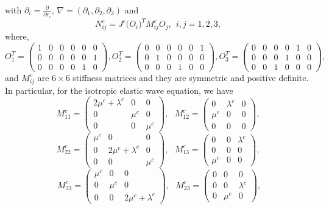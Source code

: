 with $\partial_i = \frac{\partial}{\partial r_i}$, $\nabla = (\partial_1,\partial_2,\partial_3)$ and
\begin{equation}\label{N_definition}
	N_{ij}^c = J^c\big(O_i\big)^TM_{ij}^cO_j, \ \ i,j = 1,2,3,
\end{equation}
where, 
\[ O_{1}^T = \left(\begin{array}{cccccc}
1 & 0 & 0 &0 & 0 & 0\\
0 & 0 & 0 &0 & 0 & 1\\
0 & 0 & 0 &0 & 1 & 0\end{array}\right),  O_{2}^T = \left(\begin{array}{cccccc}
0 & 0 & 0 &0 & 0 & 1\\
0 & 1 & 0 &0 & 0 & 0\\
0 & 0 & 0 &1 & 0 & 0\end{array}\right),  O_{3}^T = \left(\begin{array}{cccccc}
0 & 0 & 0 &0 & 1 & 0\\
0 & 0 & 0 &1 & 0 & 0\\
0 & 0 & 1 &0 & 0 & 0\end{array}\right),\]
and $M_{ij}^c$ are $6\times 6$ stiffness matrices and they are symmetric and positive definite. In particular, for the isotropic elastic wave equation, we have
\[ M_{11}^c = \left(\begin{array}{ccc}
2\mu^c+\lambda^c & 0 & 0\\
0 & \mu^c & 0\\
0 & 0 & \mu^c\end{array}\right),\ \ \  M_{12}^c = \left(\begin{array}{ccc}
0 & \lambda^c & 0\\
\mu^c & 0 & 0\\
0 & 0 & 0\end{array}\right), \]
\begin{equation}\label{M_definition}
M_{22}^c = \left(\begin{array}{ccc}
\mu^c & 0 & 0\\
0 & 2\mu^c+\lambda^c & 0\\
0 & 0 & \mu^c\end{array}\right),\ \ \ M_{13}^c = \left(\begin{array}{ccc}
0 & 0 & \lambda^c\\
0 & 0 & 0\\
\mu^c & 0 & 0\end{array}\right),
\end{equation}
\[\ M_{33}^c = \left(\begin{array}{ccc}
\mu^c & 0 & 0\\
0 & \mu^c & 0\\
0 & 0 & 2\mu^c+\lambda^c\end{array}\right),\ \ \ M_{23}^c = \left(\begin{array}{ccc}
0 & 0 & 0\\
0 & 0 & \lambda^c\\
0 & \mu^c & 0\end{array}\right),\]
